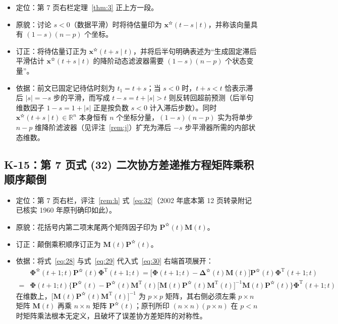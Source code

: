 \begin{itemize}
\item 定位：第 7 页右栏定理~\ref{thm:3} 正上方一段。
\item 原貌：讨论 $s < 0$（数据平滑）时将待估量印为 $\bm{x}^{\text{✫}}(t - s \mid t)$，并称该向量具有 $(1 - s)(n - p)$ 个坐标。
\item 订正：将待估量订正为 $\bm{x}^{\text{✫}}(t + s \mid t)$，并将后半句明确表述为“生成固定滞后平滑估计 $\bm{x}^{\text{✫}}(t + s \mid t)$ 的降阶动态滤波器需要 $(1 - s)(n - p)$ 个状态变量”。
\item 依据：前文已固定记待估时刻为 $t_1 = t + s$；当 $s < 0$ 时，$t + s < t$ 恰表示滞后 $|s| = -s$ 步的平滑，而写成 $t - s = t + |s| > t$ 则反转回超前预测（后半句维数因子 $1 - s = 1 + |s|$ 正是按负数 $s < 0$ 计入滞后步数）。同时 $\bm{x}^{\text{✫}}(t + s \mid t) \in \mathbb{R}^n$ 本身恒有 $n$ 个坐标分量，$(1 - s)(n - p)$ 实为将单步 $n - p$ 维降阶滤波器（见评注~\ref{rem:j}）扩充为滞后 $-s$ 步平滑器所需的内部状态维数。
\end{itemize}

\subsection{K-15：第 7 页式 (32) 二次协方差递推方程矩阵乘积顺序颠倒}\label{sec:k15}

\begin{itemize}
\item 定位：第 7 页右栏，评注~\ref{rem:h} 式~\eqref{eq:32}（2002 年底本第 12 页转录附记已核实 1960 年原刊确印如此）。
\item 原貌：花括号内第二项末尾两个矩阵因子印为 $\bm{P}^{\text{✫}}(t)\bm{M}(t)$。
\item 订正：颠倒乘积顺序订正为 $\bm{M}(t)\bm{P}^{\text{✫}}(t)$。
\item 依据：将式~\eqref{eq:28} 与式~\eqref{eq:29} 代入式~\eqref{eq:30} 右端首项展开：
\begin{equation*}
\begin{aligned}
&\bm{\Phi}^{\text{✫}}(t + 1; t)\bm{P}^{\text{✫}}(t)\bm{\Phi}^{\mathrm{T}}(t + 1; t) = \bigl[\bm{\Phi}(t + 1; t) - \bm{\Delta}^{\text{✫}}(t)\bm{M}(t)\bigr]\bm{P}^{\text{✫}}(t)\bm{\Phi}^{\mathrm{T}}(t + 1; t) \\
= &\bm{\Phi}(t + 1; t)\bigl\{\bm{P}^{\text{✫}}(t) - \bm{P}^{\text{✫}}(t)\bm{M}^{\mathrm{T}}(t)\bigl[\bm{M}(t)\bm{P}^{\text{✫}}(t)\bm{M}^{\mathrm{T}}(t)\bigr]^{-1}\bm{M}(t)\bm{P}^{\text{✫}}(t)\bigr\}\bm{\Phi}^{\mathrm{T}}(t + 1; t)
\end{aligned}
\end{equation*}
在维数上，$\bigl[\bm{M}(t)\bm{P}^{\text{✫}}(t)\bm{M}^{\mathrm{T}}(t)\bigr]^{-1}$ 为 $p \times p$ 矩阵，其右侧必须左乘 $p \times n$ 矩阵 $\bm{M}(t)$ 再乘 $n \times n$ 矩阵 $\bm{P}^{\text{✫}}(t)$；原刊所印 $(n \times n)(p \times n)$ 在 $p < n$ 时矩阵乘法根本无定义，且破坏了误差协方差矩阵的对称性。
\end{itemize}

